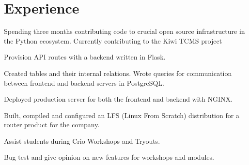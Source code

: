 \documentclass[]{resume-openfont}
\begin{document}
\begin{minipage}[t]{0.66\textwidth}


\section{Experience}

\vspace{\topsep} %
\begin{tightemize}
\item Spending three months contributing code to crucial open source infrastructure in the Python ecosystem. Currently contributing to the Kiwi TCMS project
\end{tightemize}
\sectionsep

\vspace{\topsep} %
\begin{tightemize}
\item Provision API routes with a backend written in Flask.
\item Created tables and their internal relations. Wrote queries for communication between frontend and backend servers in PostgreSQL.
\item Deployed production server for both the frontend and backend with NGINX.
\end{tightemize}
\sectionsep


\begin{tightemize}
\item Built, compiled and configured an LFS (Linux From Scratch) distribution for a router product for the company.
\end{tightemize}
\sectionsep

\begin{tightemize}
\item Assist students during Crio Workshops and Tryouts.
\item Bug test and give opinion on new features for workshops and modules.
\end{tightemize}
\sectionsep


\end{minipage}
\end{document}
